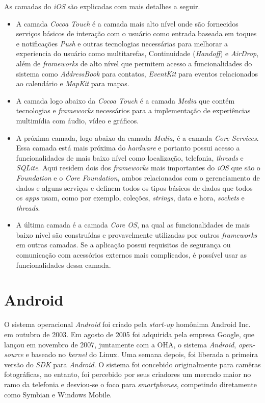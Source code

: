 As camadas do \textit{iOS} são explicadas com mais detalhes a seguir. 
\begin{itemize}

	\item A camada \textit{Cocoa Touch} é a camada mais alto nível onde são fornecidos serviços básicos de interação 
    com o usuário como entrada baseada em toques e notificações \textit{Push} e outras tecnologias necessárias para
     melhorar a experiencia do usuário como multitarefas, Continuidade (\textit{Handoff}) e \textit{AirDrop}, além de \textit{frameworks} 
     de alto nível que permitem acesso a funcionalidades do sistema como \textit{AddressBook} para contatos, \textit{EventKit} 
     para eventos relacionados ao calendário e \textit{MapKit} para mapas.
	\item A camada logo abaixo da \textit{Cocoa Touch} é a camada \textit{Media} que contém tecnologias e \textit{frameworks} necessários 
    para a implementação de experiências multimídia com áudio, vídeo e gráficos.
	\item A próxima camada, logo abaixo da camada \textit{Media}, é a camada \textit{Core Services}. Essa camada está mais próxima 
    do \textit{hardware} e portanto possui acesso a funcionalidades de mais baixo nível como localização, telefonia, \textit{threads} 
    e \textit{SQLite}. Aqui residem dois dos \textit{frameworks} mais importantes do \textit{iOS} que são o \textit{Foundation} e o \textit{Core Foundation}, 
    ambos relacionados com o gerenciamento de dados e alguns serviços e definem todos os tipos básicos de dados que 
    todos os \textit{apps} usam, como por exemplo, coleções, \textit{strings}, data e hora, \textit{sockets} e \textit{threads}.
	\item A última camada é a camada \textit{Core OS}, na qual as funcionalidades de mais baixo nível são construídas e 
    provavelmente utilizadas por outros \textit{frameworks} em outras camadas. Se a aplicação possui requisitos de segurança 
    ou comunicação com acessórios externos mais complicados, é possível usar as funcionalidades dessa camada.
    
\end{itemize}

\section{Android} \label{android}

O sistema operacional \textit{Android} foi criado pela \textit{start-up} homônima Android Inc. em outubro de 2003. Em agosto de 2005 foi adquirida pela empresa Google, que lançou
em novembro de 2007, juntamente com a OHA, o sistema \textit{Android}, \textit{open-source} e baseado no \textit{kernel} do Linux. Uma semana depois, foi liberada a primeira versão do \textit{SDK} para \textit{Android}.
O sistema foi concebido originalmente para camêras fotográficas, no entanto, foi percebido por seus criadores um mercado maior no ramo da telefonia e desviou-se o 
foco para \textit{smartphones}, competindo diretamente como Symbian e Windows Mobile.

